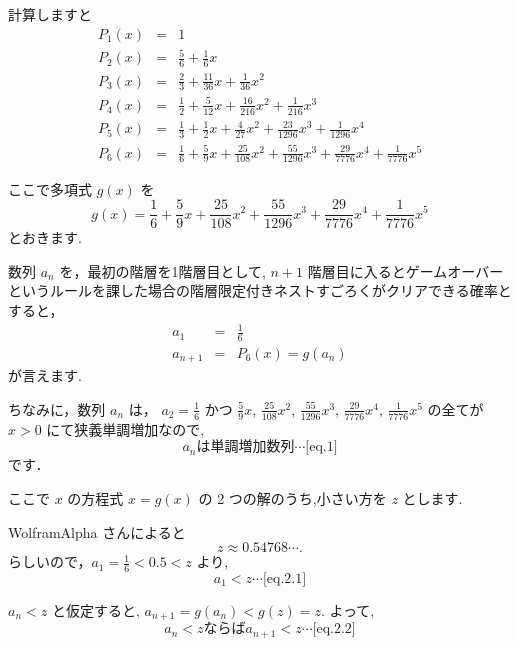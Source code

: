 \documentclass[a4j, 12pt]{jsarticle}
\begin{document}
計算しますと
\begin{eqnarray}
  P_1(x)&=& 1\\
  P_2(x)&=& \frac{5}{6} +\frac{ 1}{ 6}x\\
  P_3(x)&=& \frac{2}{3} +\frac{11}{36}x + \frac{ 1}{ 36}x^2\\
  P_4(x)&=& \frac{1}{2} +\frac{ 5}{12}x + \frac{16}{216}x^2 + \frac{ 1}{ 216} x^3\\
  P_5(x)&=& \frac{1}{3} +\frac{ 1}{ 2}x + \frac{ 4}{ 27}x^2 + \frac{23}{1296} x^3 + \frac{ 1}{1296} x^4\\
  P_6(x)&=& \frac{1}{6} +\frac{ 5}{ 9}x + \frac{25}{108}x^2 + \frac{55}{1296} x^3 + \frac{29}{7776} x^4 + \frac{1}{7776} x^5
\end{eqnarray}

ここで多項式 $g(x)$ を
\begin{equation}
  g(x) = \frac{1}{6} + \frac{5}{9} x+ \frac{25}{108} x^2 + \frac{55}{1296} x^3 + \frac{29}{7776} x^4 + \frac{1}{7776} x^5
\end{equation}
とおきます.

数列 $a_n$ を，最初の階層を1階層目として, $n+1$ 階層目に入るとゲームオーバーというルールを課した場合の階層限定付きネストすごろくがクリアできる確率とすると，
\begin{eqnarray}
  a_1 &=& \frac{1}{6}\\
  a_{n+1} &=& P_6(x) = g(a_n)
\end{eqnarray}
が言えます.

ちなみに，数列 $a_n$ は，
$a_2 = \frac{1}{6}$ かつ $\frac{5}{9}x$, $\frac{25}{108}x^2$, $\frac{55}{1296}x^3$, $\frac{29}{7776}x^4$, $\frac{1}{7776}x^5$ の全てが $x>0$ にて狭義単調増加なので,
\begin{equation*}
  a_n \textrm{は単調増加数列} \cdots \textrm{[eq.1]}
\end{equation*}
です．

ここで $x$ の方程式 $x = g(x)$ の 2 つの解のうち,小さい方を $z$ とします.

WolframAlpha さん\cite{wolframalpha}によると 
\begin{equation}
  z \approx 0.54768\cdots.
\end{equation}
らしいので，$a_1 = \frac{1}{6} < 0.5 < z$ より,
\begin{equation*}
  a_1 < z \cdots \textrm{[eq.2.1]}
\end{equation*}

$a_n < z$ と仮定すると, $a_{n+1} = g(a_n) < g(z) = z$. よって,
\begin{equation*}
  a_n < z \textrm{ならば} a_{n+1} < z \cdots \textrm{[eq.2.2]}
\end{equation*}
\end{document}
